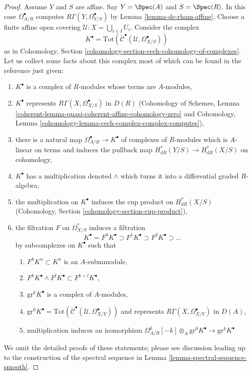 \begin{proof}
\medskip\noindent
Assume $Y$ and $S$ are affine. Say $Y = \Spec(A)$ and $S = \Spec(R)$.
In this case $\Omega^\bullet_{A/R}$ computes
$R\Gamma(Y, \Omega^\bullet_{Y/S})$ by Lemma \ref{lemma-de-rham-affine}.
Choose a finite affine open covering $\mathcal{U} : X = \bigcup_{i \in I} U_i$.
Consider the complex
$$
K^\bullet =
\text{Tot}(\check{\mathcal{C}}^\bullet(\mathcal{U}, \Omega_{X/S}^\bullet))
$$
as in
Cohomology, Section \ref{cohomology-section-cech-cohomology-of-complexes}.
Let us collect some facts about this complex most of which
can be found in the reference just given:
\begin{enumerate}
\item $K^\bullet$ is a complex of $R$-modules whose terms are
$A$-modules,
\item $K^\bullet$ represents $R\Gamma(X, \Omega^\bullet_{X/S})$ in $D(R)$
(Cohomology of Schemes, Lemma
\ref{coherent-lemma-quasi-coherent-affine-cohomology-zero} and
Cohomology, Lemma \ref{cohomology-lemma-cech-complex-complex-computes}),
\item there is a natural map $\Omega^\bullet_{A/R} \to K^\bullet$
of complexes of $R$-modules which is $A$-linear on terms and
induces the pullback map $H^*_{dR}(Y/S) \to H^*_{dR}(X/S)$
on cohomology,
\item $K^\bullet$ has a multiplication denoted $\wedge$
which turns it into a differential graded $R$-algebra,
\item the multiplication on $K^\bullet$
induces the cup product on $H^*_{dR}(X/S)$
(Cohomology, Section \ref{cohomology-section-cup-product}),
\item the filtration $F$ on $\Omega^*_{X/S}$ induces a filtration
$$
K^\bullet =
F^0K^\bullet \supset F^1K^\bullet \supset F^2K^\bullet \supset \ldots
$$
by subcomplexes on $K^\bullet$ such that
\begin{enumerate}
\item $F^kK^n \subset K^n$ is an $A$-submmodule,
\item $F^kK^\bullet \wedge F^lK^\bullet \subset F^{k + l}K^\bullet$,
\item $\text{gr}^kK^\bullet$ is a complex of $A$-modules,
\item $\text{gr}^0K^\bullet =
\text{Tot}(\check{\mathcal{C}}^\bullet(\mathcal{U}, \Omega_{X/Y}^\bullet))$
and represents $R\Gamma(X, \Omega^\bullet_{X/Y})$ in $D(A)$,
\item multiplication induces an isomorphism
$\Omega^k_{A/R}[-k] \otimes_A \text{gr}^0K^\bullet \to \text{gr}^kK^\bullet$
\end{enumerate}
\end{enumerate}
We omit the detailed proofs of these statements; please see discussion
leading up to the construction of the spectral sequence in
Lemma \ref{lemma-spectral-sequence-smooth}.


\end{proof}
